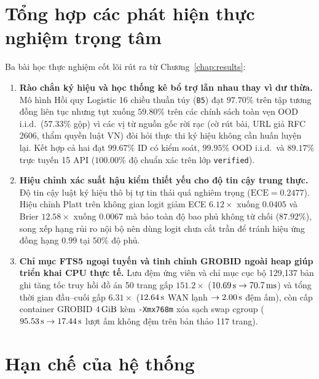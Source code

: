 \section{Tổng hợp các phát hiện thực nghiệm trọng tâm}

Ba bài học thực nghiệm cốt lõi rút ra từ Chương~\ref{chap:results}:
{\setlength{\itemsep}{0pt}\setlength{\parskip}{0pt}
\begin{enumerate}
    \item \textbf{Rào chắn ký hiệu và học thống kê bổ trợ lẫn nhau thay vì dư thừa.} Mô hình Hồi quy Logistic 16 chiều thuần túy (\texttt{B5}) đạt $97.70\%$ trên tập tương đồng liên tục nhưng tụt xuống $59.80\%$ trên các chính sách toàn vẹn OOD i.i.d.\ ($57.33\%$ gộp) vì các vị từ nguồn gốc rời rạc (cờ rút bài, URL giả RFC 2606, thẩm quyền luật VN) đòi hỏi thực thi ký hiệu không cần huấn luyện lại. Kết hợp cả hai đạt $99.67\%$ ID có kiểm soát, $99.95\%$ OOD i.i.d.\ và $89.17\%$ trực tuyến 15 API ($100.00\%$ độ chuẩn xác trên lớp \texttt{verified}).
    \item \textbf{Hiệu chỉnh xác suất hậu kiểm thiết yếu cho độ tin cậy trung thực.} Độ tin cậy luật ký hiệu thô bị tự tin thái quá nghiêm trọng ($\text{ECE} = 0.2477$). Hiệu chỉnh Platt trên không gian logit giảm ECE $6.12\times$ xuống $0.0405$ và Brier $12.58\times$ xuống $0.0067$ mà bảo toàn độ bao phủ không từ chối ($87.92\%$), song xếp hạng rủi ro nội bộ nên dùng logit chưa cắt trần để tránh hiệu ứng đồng hạng $0.99$ tại $50\%$ độ phủ.
    \item \textbf{Chỉ mục FTS5 ngoại tuyến và tinh chỉnh GROBID ngoài heap giúp triển khai CPU thực tế.} Lưu đệm ứng viên và chỉ mục cục bộ 129,137 bản ghi tăng tốc truy hồi đồ án 50 trang gấp $151.2\times$ ($10.69\text{\,s} \rightarrow 70.7\text{\,ms}$) và tổng thời gian đầu--cuối gấp $6.31\times$ ($12.64\text{\,s}$ WAN lạnh $\rightarrow 2.00\text{\,s}$ đệm ấm), còn cấp container GROBID $4\text{\,GiB}$ kèm \texttt{-Xmx768m} xóa sạch swap cgroup ($95.53\text{\,s} \rightarrow 17.44\text{\,s}$ lượt ấm không đệm trên bản thảo 117 trang).
\end{enumerate}}

\section{Hạn chế của hệ thống}
\label{sec:limitations}

